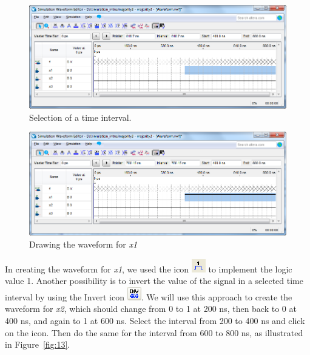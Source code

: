 \documentclass[11pt, twoside, pdftex]{article}
\begin{document}
\begin{figure}[H]
   \begin{center}
      \includegraphics[scale=0.65]{figures/figure11.png}
   \caption{Selection of a time interval.} 
	 \label{fig:11}
	 \end{center}
\end{figure}

\begin{figure}[H]
   \begin{center}
      \includegraphics[scale=0.65]{figures/figure12.png}
   \caption{Drawing the waveform for {\it x1}} 
	 \label{fig:12}
	 \end{center}
\end{figure}

In creating the waveform for {\it x1}, we used the icon \hbox{\includegraphics[scale=0.7]{figures/icon2.png}}
to implement the logic value 1. Another possibility is to invert the value of the signal
in a selected time interval by using the {\sf Invert} icon \hbox{\includegraphics[scale=0.7]{figures/icon3.png}}.
We will use this approach to create the waveform for {\it x2}, which should change from 
0 to 1 at 200 ns, then back to 0 at 400 ns, and again to 1 at 600 ns.  
Select the interval from 200 to 400 ns and click on the icon. 
Then do the same for the interval from 600 to 800 ns, as illustrated in Figure~\ref{fig:13}.
~\\
\end{document}
